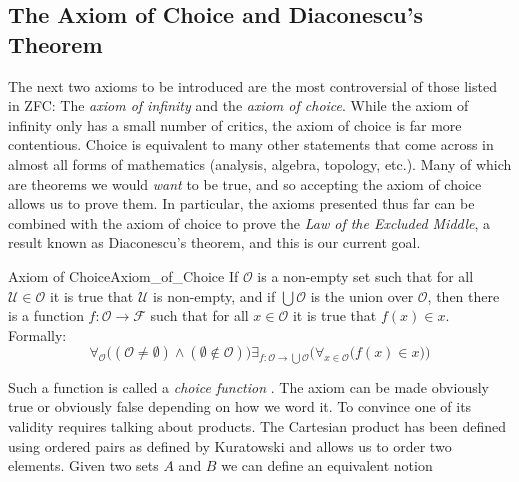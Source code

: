     \subsection{The Axiom of Choice and Diaconescu's Theorem}
        The next two axioms to be introduced are the most controversial of those
        listed in ZFC: The \textit{axiom of infinity} and the
        \textit{axiom of choice}. While the axiom of infinity only has a
        small number of critics, the axiom of choice is far more contentious.
        Choice is equivalent to many other statements that come across in
        almost all forms of mathematics (analysis, algebra, topology, etc.).
        Many of which are theorems we would \textit{want} to be true, and so
        accepting the axiom of choice allows us to prove them. In particular,
        the axioms presented thus far can be combined with the axiom of choice
        to prove the \textit{Law of the Excluded Middle}, a result known as
        Diaconescu's theorem, and this is our current goal.
        \begin{faxiom}{Axiom of Choice}{Axiom_of_Choice}
            If $\mathcal{O}$ is a non-empty set such that for all
            $\mathcal{U}\in\mathcal{O}$ it is true that $\mathcal{U}$ is
            non-empty, and if $\bigcup\mathcal{O}$ is the union over
            $\mathcal{O}$, then there is a function
            $f:\mathcal{O}\rightarrow\mathcal{F}$ such that for all
            $x\in\mathcal{O}$ it is true that $f(x)\in{x}$.
            Formally:
            \begin{equation*}
                \forall_{\mathcal{O}}\big((\mathcal{O}\ne\emptyset)\land
                    (\emptyset\notin\mathcal{O})\big)
                \exists_{f:\mathcal{O}\rightarrow\bigcup\mathcal{O}}\Big(
                \forall_{x\in\mathcal{O}}\big(f(x)\in{x}\big)\Big)
            \end{equation*}
        \end{faxiom}
        Such a function is called a \textit{choice function}%
        . The axiom can be made obviously true
        or obviously false depending on how we word it. To convince one of its
        validity requires talking about products. The
        Cartesian product has been defined using
        ordered pairs as defined by
        Kuratowski and allows us to order two
        elements. Given two sets $A$ and $B$ we can define an equivalent notion

